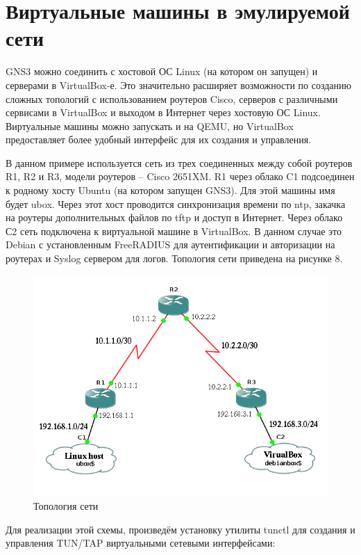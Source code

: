 \newpage
\section{Виртуальные машины в эмулируемой сети}

GNS3 можно соединить с хостовой ОС Linux (на котором он запущен) и серверами в VirtualBox-е. Это значительно расширяет возможности по созданию сложных топологий с использованием роутеров Cisco, серверов с различными сервисами в VirtualBox и выходом в Интернет через хостовую ОС Linux. Виртуальные машины можно запускать и на QEMU, но VirtualBox предоставляет более удобный интерфейс для их создания и управления.

В данном примере используется сеть из трех соединенных между собой роутеров R1, R2 и R3, модели роутеров -- Cisco 2651XM. R1 через облако C1 подсоединен к родному хосту Ubuntu (на котором запущен GNS3). Для этой машины имя будет ubox. Через этот хост проводится синхронизация времени по ntp, закачка на роутеры дополнительных файлов по tftp и доступ в Интернет. Через облако С2 сеть подключена к виртуальной машине в VirtualBox. В данном случае это Debian с установленным FreeRADIUS для аутентификации и авторизации на роутерах и Syslog сервером для логов. Топология сети приведена на рисунке 8.

\begin{figure}[h!]
\centering
\includegraphics[scale=1]{res/pic008}
\caption{Топология сети}
\end{figure}

Для реализации этой схемы, произведём установку утилиты tunctl для создания и управления TUN/TAP виртуальными сетевыми интерфейсами:

